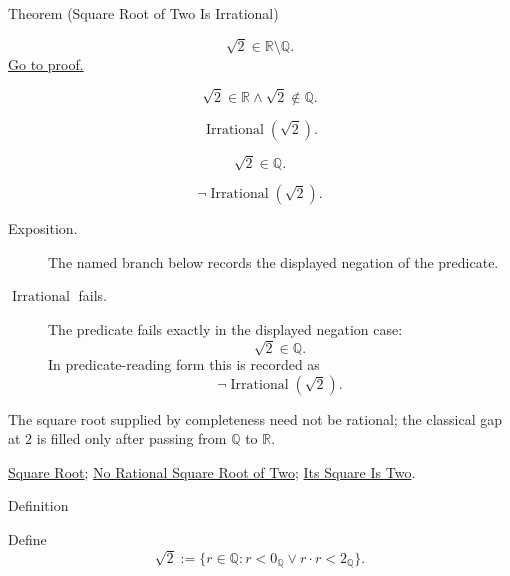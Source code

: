 \begin{theorembox}{Theorem (Square Root of Two Is Irrational)}
\begin{theorem}
\label{thm:square-root-of-two-is-irrational}
\[
\sqrt2\in\mathbb{R}\setminus\mathbb{Q}.
\]
\hyperref[prf:square-root-of-two-is-irrational]{Go to proof.}
\end{theorem}
\end{theorembox}
\begin{remark*}
\[
\sqrt2\in\mathbb{R}\land \sqrt2\notin\mathbb{Q}.
\]
\end{remark*}
\begin{remark*}
\[
\operatorname{Irrational}(\sqrt2).
\]
\end{remark*}
\begin{remark*}
\[
\sqrt2\in\mathbb{Q}.
\]
\end{remark*}
\begin{remark*}
\[
\neg\operatorname{Irrational}(\sqrt2).
\]
\end{remark*}

\begin{remark*}
\begin{description}
  \item[Exposition.] The named branch below records the displayed negation of the predicate.
  \item[\(\operatorname{Irrational}\) fails.] The predicate fails exactly in the displayed negation case:
  \[
  \sqrt2\in\mathbb{Q}.
  \]
  In predicate-reading form this is recorded as
  \[
  \neg\operatorname{Irrational}(\sqrt2).
  \]
\end{description}
\end{remark*}
\begin{remark*}[Interpretation]
The square root supplied by completeness need not be rational; the classical
gap at $2$ is filled only after passing from $\mathbb{Q}$ to $\mathbb{R}$.
\end{remark*}
\begin{dependencies}
\hyperref[def:square-root]{Square Root};
\hyperref[thm:no-rational-square-root-of-two]{No Rational Square Root of Two};
\hyperref[thm:sqrt-two-squared-is-two]{Its Square Is Two}.
\end{dependencies}

\begin{definitionbox}{Definition}
\begin{definition}
\label{def:sqrt-two-cut}
Define
\[
\sqrt{2}:=\{r\in\mathbb{Q}:r<0_{\mathbb{Q}}\lor r\cdot r<2_{\mathbb{Q}}\}.
\]
\end{definition}
\end{definitionbox}


